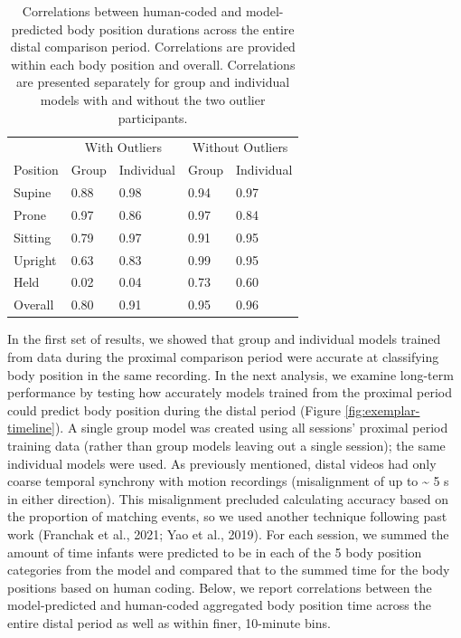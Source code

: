\documentclass[
  man]{apa6}
\begin{document}
\begin{table}[tbp]

\begin{center}
\begin{threeparttable}

\caption{\label{tab:pt2overalltable}Correlations between human-coded and model-predicted body position durations across the entire distal comparison period. Correlations are provided within each body position and overall. Correlations are presented separately for group and individual models with and without the two outlier participants.}

\begin{tabular}{lllll}
\toprule
 & \multicolumn{2}{c}{With Outliers} & \multicolumn{2}{c}{Without Outliers} \\
\cmidrule(r){2-3} \cmidrule(r){4-5}
Position & Group & Individual & Group & Individual\\
\midrule
Supine & 0.88 & 0.98 & 0.94 & 0.97\\
Prone & 0.97 & 0.86 & 0.97 & 0.84\\
Sitting & 0.79 & 0.97 & 0.91 & 0.95\\
Upright & 0.63 & 0.83 & 0.99 & 0.95\\
Held & 0.02 & 0.04 & 0.73 & 0.60\\ \midrule
Overall & 0.80 & 0.91 & 0.95 & 0.96\\
\bottomrule
\end{tabular}

\end{threeparttable}
\end{center}

\end{table}

In the first set of results, we showed that group and individual models trained from data during the proximal comparison period were accurate at classifying body position in the same recording. In the next analysis, we examine long-term performance by testing how accurately models trained from the proximal period could predict body position during the distal period (Figure \ref{fig:exemplar-timeline}). A single group model was created using all sessions' proximal period training data (rather than group models leaving out a single session); the same individual models were used. As previously mentioned, distal videos had only coarse temporal synchrony with motion recordings (misalignment of up to \textasciitilde{} 5 s in either direction). This misalignment precluded calculating accuracy based on the proportion of matching events, so we used another technique following past work (Franchak et al., 2021; Yao et al., 2019). For each session, we summed the amount of time infants were predicted to be in each of the 5 body position categories from the model and compared that to the summed time for the body positions based on human coding. Below, we report correlations between the model-predicted and human-coded aggregated body position time across the entire distal period as well as within finer, 10-minute bins.
\end{document}
